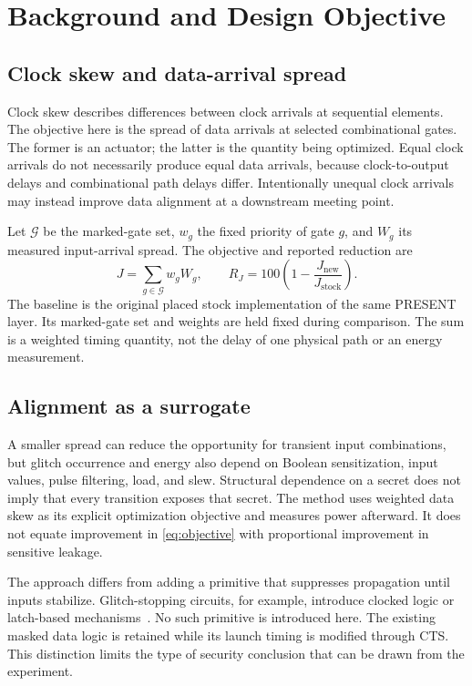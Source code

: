 \documentclass[conference]{IEEEtran}
\begin{document}
\section{Background and Design Objective}
\subsection{Clock skew and data-arrival spread}
Clock skew describes differences between clock arrivals at sequential elements. The objective here is the spread of data arrivals at selected combinational gates. The former is an actuator; the latter is the quantity being optimized. Equal clock arrivals do not necessarily produce equal data arrivals, because clock-to-output delays and combinational path delays differ. Intentionally unequal clock arrivals may instead improve data alignment at a downstream meeting point.

Let $\mathcal G$ be the marked-gate set, $w_g$ the fixed priority of gate $g$, and $W_g$ its measured input-arrival spread. The objective and reported reduction are
\begin{equation}
J=\sum_{g\in\mathcal G}w_gW_g,\qquad
R_J=100\left(1-\frac{J_{\mathrm{new}}}{J_{\mathrm{stock}}}\right).
\label{eq:objective}
\end{equation}
The baseline is the original placed stock implementation of the same PRESENT layer. Its marked-gate set and weights are held fixed during comparison. The sum is a weighted timing quantity, not the delay of one physical path or an energy measurement.

\subsection{Alignment as a surrogate}
A smaller spread can reduce the opportunity for transient input combinations, but glitch occurrence and energy also depend on Boolean sensitization, input values, pulse filtering, load, and slew. Structural dependence on a secret does not imply that every transition exposes that secret. The method uses weighted data skew as its explicit optimization objective and measures power afterward. It does not equate improvement in \eqref{eq:objective} with proportional improvement in sensitive leakage.

The approach differs from adding a primitive that suppresses propagation until inputs stabilize. Glitch-stopping circuits, for example, introduce clocked logic or latch-based mechanisms~\cite{glitch}. No such primitive is introduced here. The existing masked data logic is retained while its launch timing is modified through CTS. This distinction limits the type of security conclusion that can be drawn from the experiment.
\end{document}
